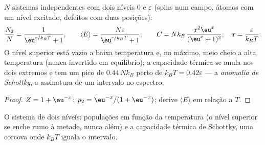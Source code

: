 \begin{proposition}\label{prop:b2:boltzmann-factor:twolevel}
$N$ sistemas independentes com dois níveis $0$ e $\varepsilon$ (spins num
campo, átomos com um nível excitado, defeitos com duas posições):
\[
\frac{N_2}{N} = \frac{1}{\eu^{\varepsilon/k_BT} + 1}, \qquad
\langle E\rangle = \frac{N\varepsilon}{\eu^{\varepsilon/k_BT} + 1}, \qquad
C = Nk_B\,\frac{x^2\eu^x}{(\eu^x + 1)^2}, \quad x = \frac{\varepsilon}{k_BT} .
\]
O nível superior está vazio a baixa temperatura e, no máximo, meio cheio a
alta temperatura (nunca invertido em equilíbrio); a capacidade térmica
se anula nos dois extremos e tem um pico de $0.44\,Nk_B$ perto de $k_BT = 0.42
\varepsilon$ --- a \emph{anomalia de Schottky}, a
assinatura de um intervalo no espectro.
\end{proposition}

\begin{proof}
$Z = 1 + \eu^{-x}$; $p_2 = \eu^{-x}/(1 + \eu^{-x})$; derive $\langle
E\rangle$ em relação a $T$.
\end{proof}

\begin{omfigure}

{\small O sistema de dois níveis: populações em função da temperatura (o
nível superior se enche rumo à metade, nunca além) e a capacidade térmica
de Schottky, uma corcova onde $k_BT$ iguala o intervalo.}
\end{omfigure}


